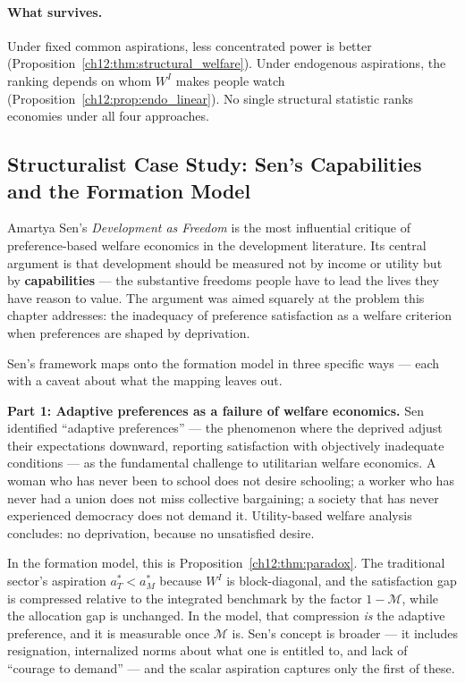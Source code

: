 \documentclass[../structural_economics_book.tex]{subfiles}
\begin{document}
\paragraph{What survives.} Under fixed common aspirations, less concentrated power is better (Proposition~\ref{ch12:thm:structural_welfare}). Under endogenous aspirations, the ranking depends on whom $W^I$ makes people watch (Proposition~\ref{ch12:prop:endo_linear}). No single structural statistic ranks economies under all four approaches.


\subsection*{Structuralist Case Study: Sen's Capabilities and the Formation Model}

Amartya Sen's \textit{Development as Freedom} \citeyearpar{sen1999development} is the most influential critique of preference-based welfare economics in the development literature. Its central argument is that development should be measured not by income or utility but by \textbf{capabilities} --- the substantive freedoms people have to lead the lives they have reason to value. The argument was aimed squarely at the problem this chapter addresses: the inadequacy of preference satisfaction as a welfare criterion when preferences are shaped by deprivation.

Sen's framework maps onto the formation model in three specific ways --- each with a caveat about what the mapping leaves out.

\textbf{Part 1: Adaptive preferences as a failure of welfare economics.} Sen identified ``adaptive preferences'' --- the phenomenon where the deprived adjust their expectations downward, reporting satisfaction with objectively inadequate conditions --- as the fundamental challenge to utilitarian welfare economics. A woman who has never been to school does not desire schooling; a worker who has never had a union does not miss collective bargaining; a society that has never experienced democracy does not demand it. Utility-based welfare analysis concludes: no deprivation, because no unsatisfied desire.

In the formation model, this is Proposition~\ref{ch12:thm:paradox}. The traditional sector's aspiration $a_T^* < a_M^*$ because $W^I$ is block-diagonal, and the satisfaction gap is compressed relative to the integrated benchmark by the factor $1 - \mathcal{M}$, while the allocation gap is unchanged. In the model, that compression \textit{is} the adaptive preference, and it is measurable once $\mathcal{M}$ is. Sen's concept is broader --- it includes resignation, internalized norms about what one is entitled to, and lack of ``courage to demand'' --- and the scalar aspiration captures only the first of these.
\end{document}
